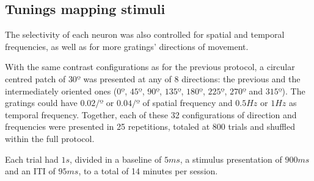 \subsection{Tunings mapping stimuli}
\label{subsec:subbsectionC}

The selectivity of each neuron was also controlled for spatial and temporal frequencies, as well as for more gratings' directions of movement. 

With the same contrast configurations as for the previous protocol, a circular centred patch of $30º$ was presented at any of 8 directions: the previous and the intermediately oriented ones ($0º$, $45º$, $90º$, $135º$, $180º$, $225º$, $270º$ and $315º$). The gratings could have $0.02 /º$ or $0.04 /º$ of spatial frequency and $0.5 Hz$ or $1 Hz$ as temporal frequency. Together, each of these 32 configurations of direction and frequencies were presented in 25 repetitions, totaled at 800 trials and shuffled within the full protocol.

Each trial had $1 s$, divided in a baseline of $5 ms$, a stimulus presentation of $900 ms$ and an ITI of $95 ms$, to a total of 14 minutes per session.

\begin{table}[H]
\begin{center}\par
{}
 \caption{Configurations regarding the tuning mapping protocol stimuli properties.}
    \vspace{-5mm}
    \label{table:tuning}
\end{center}
\end{table}

